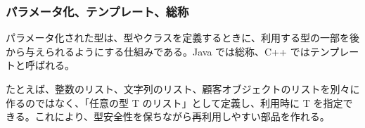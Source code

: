 \subsubsection{パラメータ化、テンプレート、総称}

パラメータ化された型は、型やクラスを定義するときに、利用する型の一部を後から与えられるようにする仕組みである。Java では総称、C++ ではテンプレートと呼ばれる。

たとえば、整数のリスト、文字列のリスト、顧客オブジェクトのリストを別々に作るのではなく、「任意の型 T のリスト」として定義し、利用時に T を指定できる。これにより、型安全性を保ちながら再利用しやすい部品を作れる。
